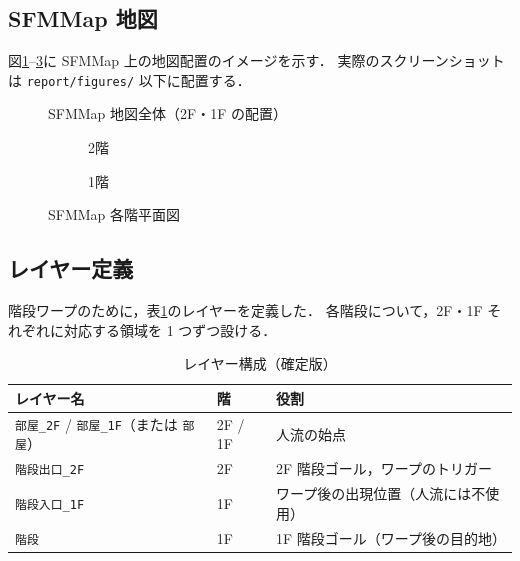 \documentclass[11pt,a4paper]{ltjsarticle}
\begin{document}
\subsection{SFMMap 地図}

図\ref{fig:sfmmap_overview}--\ref{fig:sfmmap_1f}に SFMMap 上の地図配置のイメージを示す．
実際のスクリーンショットは \texttt{report/figures/} 以下に配置する．

\begin{figure}[H]
  \centering
  \caption{SFMMap 地図全体（2F・1F の配置）}
  \label{fig:sfmmap_overview}
\end{figure}

\begin{figure}[H]
  \centering
  \begin{subfigure}{0.48\linewidth}
    \centering
    \caption{2階}
    \label{fig:sfmmap_2f}
  \end{subfigure}
  \hfill
  \begin{subfigure}{0.48\linewidth}
    \centering
    \caption{1階}
    \label{fig:sfmmap_1f}
  \end{subfigure}
  \caption{SFMMap 各階平面図}
  \label{fig:sfmmap_floors}
\end{figure}

\subsection{レイヤー定義}

階段ワープのために，表\ref{tab:layers}のレイヤーを定義した．
各階段について，2F・1F それぞれに対応する領域を 1 つずつ設ける．

\begin{table}[H]
  \centering
  \caption{レイヤー構成（確定版）}
  \label{tab:layers}
  \begin{tabular}{lll}
    \toprule
    レイヤー名 & 階 & 役割 \\
    \midrule
    \texttt{部屋\_2F} / \texttt{部屋\_1F}（または \texttt{部屋}） & 2F / 1F & 人流の始点 \\
    \texttt{階段出口\_2F} & 2F & 2F 階段ゴール，ワープのトリガー \\
    \texttt{階段入口\_1F} & 1F & ワープ後の出現位置（人流には不使用） \\
    \texttt{階段} & 1F & 1F 階段ゴール（ワープ後の目的地） \\
    \bottomrule
  \end{tabular}
\end{table}
\end{document}
